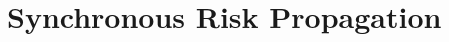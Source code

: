 %
%

\section{Synchronous Risk Propagation}\label{sec:synchronous}

\newcommand{\topK}[1]{\text{top } K \text{ of } #1}
\newcommand{\maxScores}{\scores[\textit{max}]}
\newcommand{\iScores}[2]{\scores[#1]^{(#2)}}
\newcommand{\iMaxScores}[1]{\maxScores^{(#1)}}
\newcommand{\dist}{d}

